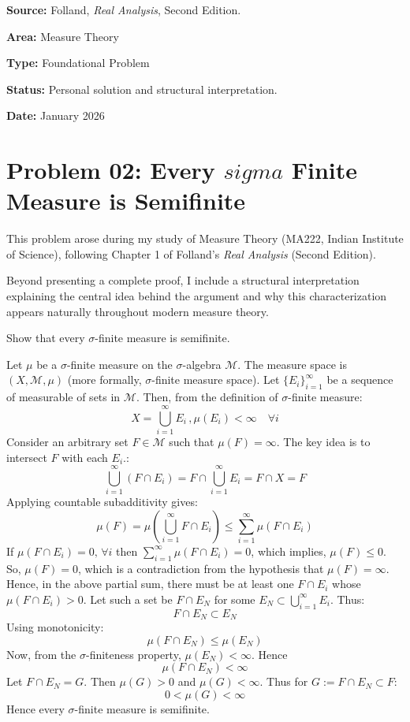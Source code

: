 \noindent\textbf{Source:}
Folland, \emph{Real Analysis}, Second Edition.

\medskip

\noindent\textbf{Area:}
Measure Theory

\medskip

\noindent\textbf{Type:}
Foundational Problem

\medskip

\noindent\textbf{Status:}
Personal solution and structural interpretation.

\medskip

\noindent\textbf{Date:}
January 2026
\section*{Problem 02: Every $sigma$ Finite Measure is Semifinite}
This problem arose during my study of Measure Theory (MA222, Indian Institute of Science), following Chapter 1 of Folland's \emph{Real Analysis} (Second Edition).

Beyond presenting a complete proof, I include a structural interpretation explaining the central idea behind the argument and why this characterization appears naturally throughout modern measure theory.  
\begin{problem}
Show that every $\sigma$-finite measure is semifinite. 
\end{problem}
\begin{solution}
Let $\mu$ be a $\sigma$-finite measure on the $\sigma$-algebra $\mathcal{M}$. The measure space is $(X, \mathcal{M},\mu)$ (more formally, $\sigma$-finite measure space). Let $\{E_i\}_{i=1}^\infty$ be a sequence of measurable of sets in $\mathcal{M}$. Then, from the definition of $\sigma$-finite measure:
\[
X=\bigcup_{i=1}^\infty E_i\, , \mu(E_i)<\infty \quad \forall i
\]
Consider an arbitrary set $F\in\mathcal{M}$ such that $\mu(F)=\infty$. The key idea is to intersect $F$ with each $E_i$.:
\[
\bigcup_{i=1}^\infty (F\cap E_i)=F\cap \bigcup_{i=1}^\infty E_i= F\cap X= F
\]
Applying countable subadditivity gives:
\[
\mu(F)=\mu(\bigcup_{i=1}^\infty F\cap E_i)\le\sum_{i=1}^\infty \mu(F\cap E_i)
\]
If $\mu(F\cap E_i)=0,\, \forall i$ then $\sum_{i=1}^\infty\mu(F\cap E_i)=0$, which implies, $\mu(F)\le 0$. So, $\mu(F)=0$, which is a contradiction from the hypothesis that $\mu(F)=\infty$. Hence, in the above partial sum, there must be at least one $F\cap E_i$ whose $\mu(F\cap E_i)>0$. Let such a set be $F\cap E_N$ for some $E_N\subset \bigcup_{i=1}^\infty E_i$. Thus:
\[
F\cap E_N\subset E_N
\]
Using monotonicity:
\[
\mu(F\cap E_N)\le\mu(E_N)
\]
Now, from the $\sigma$-finiteness property, $\mu(E_N)<\infty$. Hence
\[
\mu(F\cap E_N)<\infty
\]
Let $F\cap E_N =G$. Then $\mu(G)>0$ and $\mu(G)<\infty$. Thus for $G:=F\cap E_N\subset F$:
\[
\boxed{0<\mu(G)<\infty}
\]
Hence every $\sigma$-finite measure is semifinite.
\end{solution}

